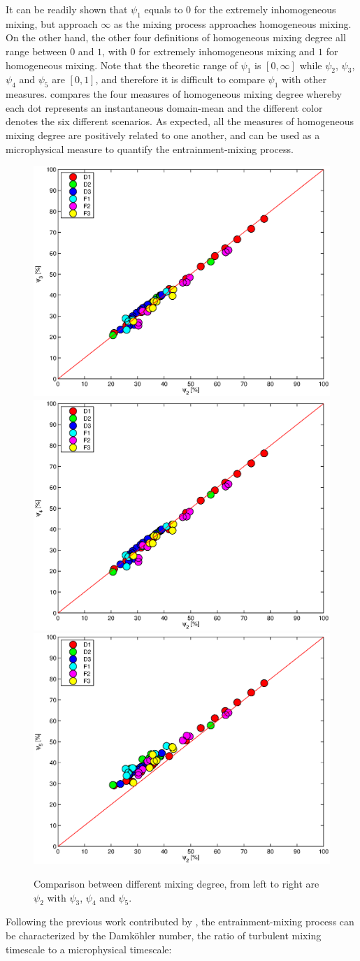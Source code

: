 It can be readily shown that $\psi_1$ equals to $0$ for the extremely inhomogeneous mixing, but 
approach $\infty$ as the mixing process approaches homogeneous mixing. On the other hand, the 
other four definitions of homogeneous mixing degree all range between $0$ and $1$, with $0$ for 
extremely inhomogeneous mixing and $1$ for homogeneous mixing. 
Note that the theoretic range of $\psi_1$ is $[0, \infty]$ while $\psi_2$, $\psi_3$, $\psi_4$ and $\psi_5$ 
are $[0, 1]$, and therefore it is difficult to compare $\psi_1$ with other measures.
 compares the four measures of homogeneous mixing degree whereby each dot represents an 
instantaneous domain-mean and the different color denotes the six different scenarios.
As expected, all the measures of homogeneous mixing degree are positively related 
to one another, and can be used as a microphysical measure to quantify the entrainment-mixing process.
\begin{figure}[!htbp]\centering
\includegraphics[width=0.3\linewidth]{Figures/phi2_phi3}
\includegraphics[width=0.3\linewidth]{Figures/phi2_phi4}
\includegraphics[width=0.3\linewidth]{Figures/phi2_phi5}
\caption{Comparison between different mixing degree, from left to right are $\psi_2$ with $\psi_3$, $\psi_4$ and $\psi_5$.\label{phi_compare}}
\end{figure}

Following the previous work contributed by 
\cite{Krueger1997Modeling,Grabowski1993Cumulus, Burnet2007Observational}, 
the entrainment-mixing process can be characterized by the Damk{\"o}hler number, the ratio of 
turbulent mixing timescale to a microphysical timescale:

